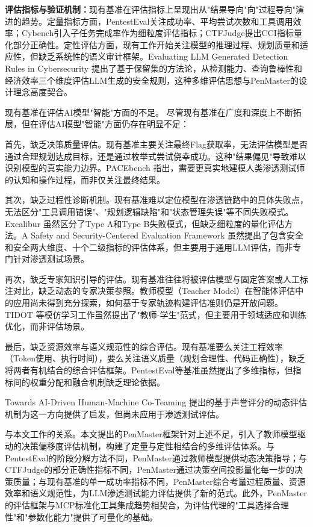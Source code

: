\documentclass[a4paper, twocolumn]{article}
\begin{document}
\textbf{评估指标与验证机制：}现有基准在评估指标上呈现出从"结果导向"向"过程导向"演进的趋势。定量指标方面，PentestEval关注成功率、平均尝试次数和工具调用效率；Cybench引入子任务完成率作为细粒度评估指标；CTFJudge提出CCI指标量化部分正确性。定性评估方面，现有工作开始关注模型的推理过程、规划质量和适应性，但缺乏系统性的语义审计框架。Evaluating LLM Generated Detection Rules in Cybersecurity \cite{bertiger2025evaluating} 提出了基于保留集的方法论，从检测能力、查询鲁棒性和经济效率三个维度评估LLM生成的安全规则，这种多维评估思想与PenMaster的设计理念高度契合。

现有基准在评估AI模型"智能"方面的不足。 尽管现有基准在广度和深度上不断拓展，但在评估AI模型"智能"方面仍存在明显不足：

首先，缺乏决策质量评估。现有基准主要关注最终Flag获取率，无法评估模型是否通过合理规划达成目标，还是通过枚举式尝试侥幸成功。这种"结果偏见"导致难以识别模型的真实能力边界。PACEbench \cite{liu2025pacebench} 指出，需要更真实地建模人类渗透测试师的认知和操作过程，而非仅关注最终结果。

其次，缺乏过程性诊断机制。现有基准难以定位模型在渗透链路中的具体失败点，无法区分"工具调用错误"、"规划逻辑缺陷"和"状态管理失误"等不同失败模式。Excalibur \cite{deng2026good} 虽然区分了Type A和Type B失败模式，但缺乏细粒度的量化评估方法。A Safety and Security-Centered Evaluation Framework \cite{zhang2026safety} 虽然提出了包含安全和安全两大维度、十个二级指标的评估体系，但主要用于通用LLM评估，而非专门针对渗透测试场景。

再次，缺乏专家知识引导的评估。现有基准往往将被评估模型与固定答案或人工标注对比，缺乏动态的专家决策参照。教师模型（Teacher Model）在智能体评估中的应用尚未得到充分探索，如何基于专家轨迹构建评估准则仍是开放问题。TIDOT \cite{nguyen2021tidot} 等模仿学习工作虽然提出了"教师-学生"范式，但主要用于领域适应和训练优化，而非评估场景。

最后，缺乏资源效率与语义规范性的综合评估。现有基准要么关注工程效率（Token使用、执行时间），要么关注语义质量（规划合理性、代码正确性），缺乏将两者有机结合的综合评估框架。PentestEval等基准虽然提出了多维指标，但指标间的权重分配和融合机制缺乏理论依据。

Towards AI-Driven Human-Machine Co-Teaming \cite{liu2025teaming} 提出的基于声誉评分的动态评估机制为这一方向提供了启发，但尚未应用于渗透测试评估。

与本文工作的关系。本文提出的PenMaster框架针对上述不足，引入了教师模型驱动的决策偏移度评估机制，构建了定量与定性相结合的多维评估体系。与PentestEval的阶段分解方法不同，PenMaster通过教师模型提供动态决策指导；与CTFJudge的部分正确性指标不同，PenMaster通过决策空间投影量化每一步的决策质量；与现有基准的单一成功率指标不同，PenMaster综合考量过程质量、资源效率和语义规范性，为LLM渗透测试能力评估提供了新的范式。此外，PenMaster的评估框架与MCP标准化工具集成趋势相契合，为评估代理的"工具选择合理性"和"参数化能力"提供了可量化的基础。
\end{document}
